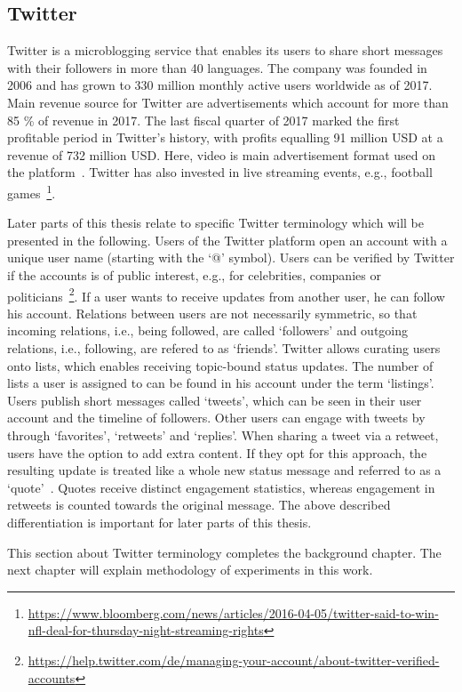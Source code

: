 \subsection{Twitter}
\label{sub:sn_twitter}

Twitter is a microblogging service that enables its users to share short
messages with their followers in more than 40 languages.
The company was founded in 2006 and has grown to 330 million monthly active
users worldwide as of 2017.
Main revenue source for Twitter are advertisements which account for more than
85 \% of revenue in 2017.
The last fiscal quarter of 2017 marked the first profitable period in Twitter's
history, with profits equalling 91 million USD at a revenue of 732 million USD.
Here, video is main advertisement format used on the platform~\cite{Twitter2018}.
Twitter has also invested in live streaming events, e.g., football games~\footnote{\url{https://www.bloomberg.com/news/articles/2016-04-05/twitter-said-to-win-nfl-deal-for-thursday-night-streaming-rights}}.

Later parts of this thesis relate to specific Twitter terminology which will be 
presented in the following.
Users of the Twitter platform open an account with a unique user name (starting
with the `@' symbol).
Users can be verified by Twitter if the accounts is of public interest, e.g.,
for celebrities, companies or politicians~\footnote{\url{https://help.twitter.com/de/managing-your-account/about-twitter-verified-accounts}}.
If a user wants to receive updates from another user, he can follow his
account.
Relations between users are not necessarily symmetric, so that incoming relations,
i.e., being followed, are called `followers' and outgoing relations, i.e.,
following, are refered to as `friends'.
Twitter allows curating users onto lists, which enables receiving topic-bound
status updates.
The number of lists a user is assigned to can be found in his account under the
term `listings'.
Users publish short messages called `tweets', which can be seen in their user
account and the timeline of followers.
Other users can engage with tweets by through `favorites', `retweets' and `replies'.
When sharing a tweet via a retweet, users have the option to add extra content.
If they opt for this approach, the resulting update is treated like a whole new
status message and referred to as a `quote'~\cite{Kwak2010}.
Quotes receive distinct engagement statistics, whereas engagement in retweets
is counted towards the original message.
The above described differentiation is important for later parts of this thesis.

This section about Twitter terminology completes the background chapter.
The next chapter will explain methodology of experiments in this work.
